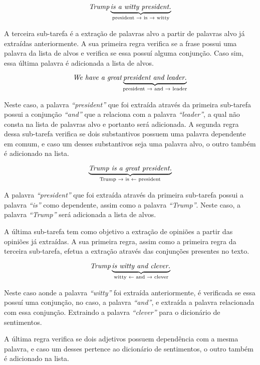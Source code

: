 \[\textit{Trump} \underbrace{\textit{is a witty president.}}_\text{president
\textrightarrow \text{ is} \textrightarrow \text{ witty}}\]

A terceira sub-tarefa é a extração de palavras alvo a partir de palavras alvo já
extraídas anteriormente. A sua primeira regra verifica se a frase possui uma
palavra da lista de alvos e verifica se essa possuí alguma conjunção. Caso sim,
essa última palavra é adicionada a lista de alvos.


\[\textit{We have a great} \underbrace{\textit{president and
leader.}}_\text{president \textrightarrow \text{ and} \textrightarrow \text{
leader}}\]

Neste caso, a palavra \textit{``president''} que foi extraída através da primeira
sub-tarefa possui a conjunção \textit{``and''} que a relaciona com a palavra
\textit{``leader''}, a qual não consta na lista de palavras alvo e portanto será
adicionada. A segunda regra dessa sub-tarefa verifica se dois substantivos
possuem uma palavra dependente em comum, e caso um desses substantivos seja
uma palavra alvo, o outro também é adicionado na lista.

\[\underbrace{\textit{Trump is a great president.}}_\text{Trump
\textrightarrow \text{ is} \textleftarrow \text{ president}}\]

A palavra \textit{``president''} que foi extraída através da primeira
sub-tarefa possui a palavra \textit{``is''} como dependente, assim como a
palavra \textit{``Trump''}. Neste caso, a palavra \textit{``Trump''} será
adicionada a lista de alvos.

A última sub-tarefa tem como objetivo a extração de opiniões a partir das
opiniões já extraídas. A sua primeira regra, assim como a primeira regra da
terceira sub-tarefa, efetua a extração através das conjunções presentes no
texto.

\[\textit{Trump} \underbrace{\textit{is witty and clever.}}_\text{witty
\textleftarrow \text{ and} \textrightarrow \text{ clever}}\]

Neste caso aonde a palavra \textit{``witty''} foi extraída anteriormente, é
verificada se essa possuí uma conjunção, no caso, a palavra \textit{``and''}, e
extraída a palavra relacionada com essa conjunção. Extraindo a palavra
\textit{``clever''} para o dicionário de sentimentos.

A última regra verifica se dois adjetivos possuem dependência com a
mesma palavra, e caso um desses pertence ao dicionário de sentimentos, o outro
também é adicionado na lista.

